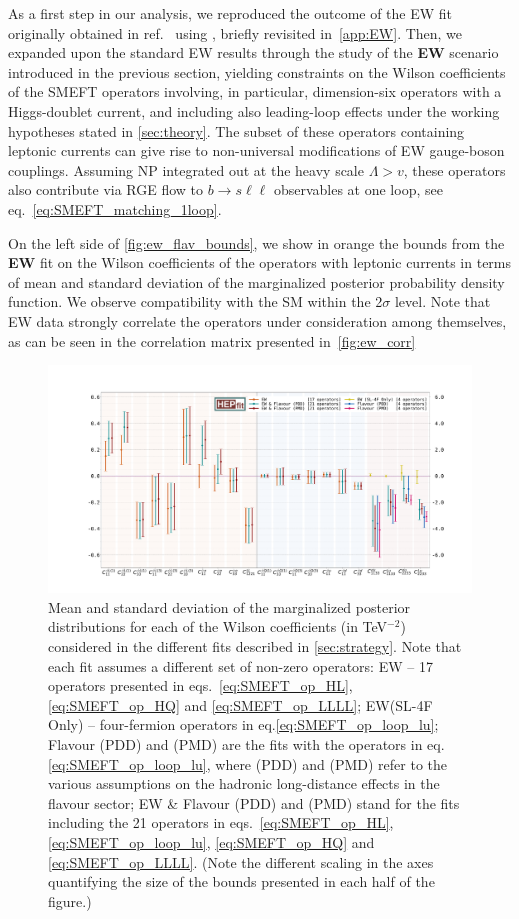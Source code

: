 As a first step in our analysis, we reproduced the outcome of the EW fit originally obtained in ref.~\cite{Efrati:2015eaa} using \HEPfit, briefly revisited in~\autoref{app:EW}. 
Then, we expanded upon the standard EW results through the study of the {\bf EW} scenario introduced in the previous section, yielding constraints on the Wilson coefficients of the SMEFT operators involving, in particular, dimension-six operators with a Higgs-doublet current, and including also leading-loop effects under the working hypotheses stated in \autoref{sec:theory}. The subset of these operators containing leptonic currents can give rise to non-universal modifications of EW gauge-boson couplings. Assuming NP integrated out at the heavy scale $\Lambda > v$, these operators also contribute via RGE flow to $b \to s \ell \ell $ observables at one loop, see eq.~\eqref{eq:SMEFT_matching_1loop}.

{On the left side of \autoref{fig:ew_flav_bounds}, we show in orange the bounds from the {\bf EW} fit on the Wilson coefficients of the operators with leptonic currents in terms of mean and standard deviation of the marginalized posterior probability density function. We observe compatibility with the SM within the 2$\sigma$ level. Note that EW data strongly correlate the operators under consideration among themselves, as can be seen in the correlation matrix presented in~\autoref{fig:ew_corr}}
\newpage
\begin{figure}
	\centering
	\includegraphics[width=\textwidth]{figures/errorbar.pdf}
	\caption{Mean and standard deviation of the marginalized posterior distributions for each of the Wilson coefficients (in TeV$^{-2}$) considered in the different fits described in \autoref{sec:strategy}.
		Note that each fit assumes a different set of non-zero operators:
		EW -- 17 operators presented in eqs.~\eqref{eq:SMEFT_op_HL}, \eqref{eq:SMEFT_op_HQ} and \eqref{eq:SMEFT_op_LLLL};  EW(SL-4F Only) -- four-fermion operators in eq.\eqref{eq:SMEFT_op_loop_lu}; Flavour (PDD) and (PMD) are the fits with the operators in eq.\eqref{eq:SMEFT_op_loop_lu}, where (PDD) and (PMD) refer to the various assumptions on the hadronic long-distance effects in the flavour sector; EW \& Flavour (PDD) and (PMD) stand for the fits including the 21 operators in eqs.~\eqref{eq:SMEFT_op_HL}, \eqref{eq:SMEFT_op_loop_lu}, \eqref{eq:SMEFT_op_HQ} and \eqref{eq:SMEFT_op_LLLL}. (Note the different scaling in the axes quantifying the size of the bounds presented in each half of the figure.)
	}
	\label{fig:ew_flav_bounds}
\end{figure}
\FloatBarrier

